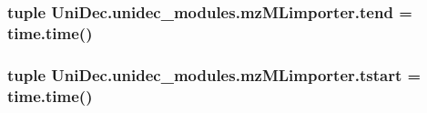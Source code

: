 \subsubsection[{tend}]{\setlength{\rightskip}{0pt plus 5cm}tuple Uni\+Dec.\+unidec\+\_\+modules.\+mz\+M\+Limporter.\+tend = time.\+time()}\label{namespace_uni_dec_1_1unidec__modules_1_1mz_m_limporter_ac2d823261c18ce098ddb2cdde3a435bf}
\hypertarget{namespace_uni_dec_1_1unidec__modules_1_1mz_m_limporter_a3ef8ebcc858234a798d0f6842c5041bc}{}
\subsubsection[{tstart}]{\setlength{\rightskip}{0pt plus 5cm}tuple Uni\+Dec.\+unidec\+\_\+modules.\+mz\+M\+Limporter.\+tstart = time.\+time()}\label{namespace_uni_dec_1_1unidec__modules_1_1mz_m_limporter_a3ef8ebcc858234a798d0f6842c5041bc}
